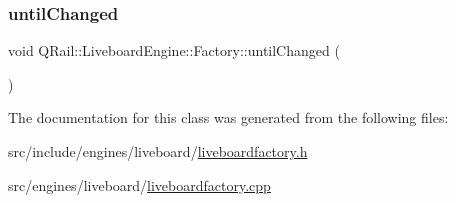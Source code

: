 \subsubsection{\texorpdfstring{untilChanged}{untilChanged}}
{\footnotesize\ttfamily void Q\+Rail\+::\+Liveboard\+Engine\+::\+Factory\+::until\+Changed (\begin{DoxyParamCaption}{ }\end{DoxyParamCaption})\hspace{0.3cm}{\ttfamily [signal]}}



The documentation for this class was generated from the following files\+:\begin{DoxyCompactItemize}
\item 
src/include/engines/liveboard/\mbox{\hyperlink{liveboardfactory_8h}{liveboardfactory.\+h}}\item 
src/engines/liveboard/\mbox{\hyperlink{liveboardfactory_8cpp}{liveboardfactory.\+cpp}}\end{DoxyCompactItemize}
